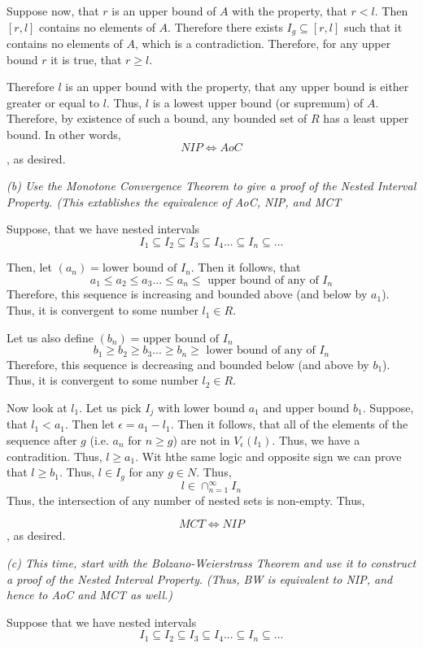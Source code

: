 \documentclass[11pt,oneside,titlepage]{article}
\begin{document}
Suppose now, that $r$ is an upper bound of $A$ with the property, that
$r < l$. Then $[r, l]$ contains no elements of $A$. Therefore there exists
$I_g \subseteq [r, l]$ such that it contains no elements of $A$,
which is a contradiction. Therefore, for any upper bound $r$ it is true, that
$r \geq l$.

Therefore $l$ is an upper bound with the property, that any  upper bound
is either greater or equal to $l$. Thus, $l$ is a lowest upper bound
(or supremum) of $A$. Therefore, by existence of such a bound,
any bounded set of $R$ has a least  upper bound. In other words,
$$NIP\iff AoC$$
, as desired.

\textit{(b) Use the Monotone Convergence Theorem to give a proof of the
  Nested Interval Property. (This extablishes the equivalence of AoC,
  NIP, and MCT}

Suppose, that we have nested intervals
$$I_1 \subseteq I_2 \subseteq I_3 \subseteq I_4 ... \subseteq I_n \subseteq ...$$

Then, let $(a_n) = \text{lower bound of }I_n$. Then it follows, that
$$a_1 \leq a_2 \leq a_3 ... \leq a_n \leq \text{ upper bound of any of } I_n$$
Therefore, this sequence is increasing  and bounded above (and below by $a_1$).
Thus, it is convergent to some number $l_1 \in R$.

Let us also define $(b_n) = \text{upper bound of }I_n$
$$b_1 \geq b_2 \geq b_3 ... \geq b_n \geq \text{ lower bound of any of } I_n$$
Therefore, this sequence is decreasing  and bounded below (and above by $b_1$).
Thus, it is convergent to some number $l_2 \in R$.

Now look at $l_1$. Let us pick $I_j$ with lower  bound $a_1$ and upper bound
$b_1$. Suppose, that $l_1 < a_1$. Then let $\epsilon = a_1 - l_1$. Then it
follows, that all of the elements of the sequence after $g$ (i.e. $a_n$ for $n \geq g$) are not in $V_\epsilon(l_1)$. Thus, we have a contradition. Thus,
$l \geq a_1$. Wit hthe same logic and opposite sign we can prove that
$l \geq b_1$. Thus, $l \in I_g$ for any $g \in N$. Thus,
$$l \in \cap_{n = 1}^{\infty}I_n$$
Thus, the intersection of any number of nested sets is non-empty. Thus,

$$MCT \iff NIP$$
, as desired.

\textit{(c) This time, start with the Bolzano-Weierstrass Theorem and
  use it to construct a proof of the Nested Interval Property. (Thus, BW
  is equivalent to NIP, and hence to AoC and MCT as well.)}

Suppose that we have nested intervals
$$I_1 \subseteq I_2 \subseteq I_3 \subseteq I_4 ... \subseteq I_n \subseteq ...$$
\end{document}
